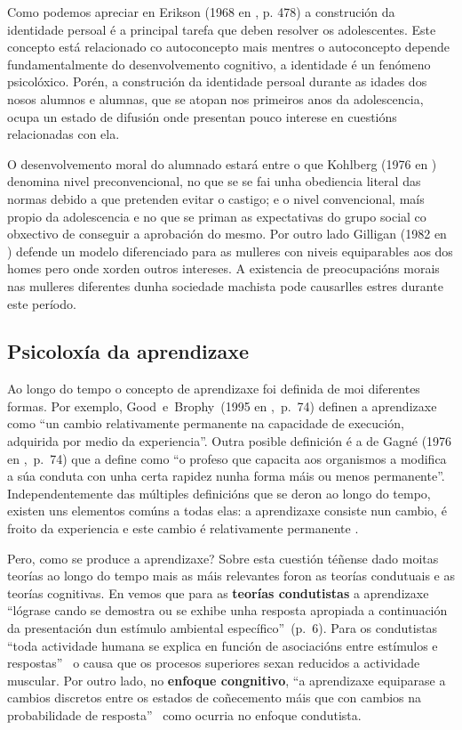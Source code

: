 Como podemos apreciar en Erikson (1968 en , p. 478) a construción da identidade persoal é a principal tarefa que deben resolver os adolescentes. Este concepto está relacionado co autoconcepto mais mentres o autoconcepto depende fundamentalmente do desenvolvemento cognitivo, a identidade é un fenómeno psicolóxico. Porén, a construción da identidade persoal durante as idades dos nosos alumnos e alumnas, que se atopan nos primeiros anos da adolescencia, ocupa un estado de difusión onde presentan pouco interese en cuestións relacionadas con ela.

O desenvolvemento moral do alumnado estará entre o que Kohlberg (1976 en ) denomina nivel preconvencional, no que se se fai unha obediencia literal das normas debido a que pretenden evitar o castigo; e o nivel convencional, maís propio da adolescencia e no que se priman as expectativas do grupo social co obxectivo de conseguir a aprobación do mesmo. Por outro lado Gilligan (1982 en ) defende un modelo diferenciado para as mulleres con niveis equiparables aos dos homes pero onde xorden outros intereses. A existencia de preocupacións morais nas mulleres diferentes dunha sociedade machista pode causarlles estres durante este período.

\subsection{Psicoloxía da aprendizaxe}
Ao longo do tempo o concepto de aprendizaxe foi definida de moi diferentes formas. Por exemplo, Good~e~Brophy~(1995 en ,~p.~74) definen a aprendizaxe como ``un cambio relativamente permanente na capacidade de execución, adquirida por medio da experiencia''. Outra posible definición é a de Gagné (1976 en ,~p.~74) que a define como ``o profeso que capacita aos organismos a modifica a súa conduta con unha certa rapidez nunha forma máis ou menos permanente''. Independentemente das múltiples definicións que se deron ao longo do tempo, existen uns elementos comúns a todas elas: a aprendizaxe consiste nun cambio, é froito da experiencia e este cambio é relativamente permanente \cite{unedpsicoedu}.

Pero, como se produce a aprendizaxe? Sobre esta cuestión téñense dado moitas teorías ao longo do tempo mais as máis relevantes foron as teorías condutuais e as teorías cognitivas. En  vemos que para as \textbf{teorías condutistas} a aprendizaxe ``lógrase cando se demostra ou se exhibe unha resposta apropiada a continuación da presentación dun estímulo ambiental específico''~(p.~6). Para os condutistas ``toda actividade humana se explica en función de asociacións entre estímulos e respostas''~\cite[p.~82]{unedpsicoedu} o causa que os procesos superiores sexan reducidos a actividade muscular. Por outro lado, no \textbf{enfoque congnitivo}, ``a aprendizaxe equiparase a cambios discretos entre os estados de coñecemento máis que con cambios na probabilidade de resposta''~\cite[p.~9]{ertmer1993conductismo} como ocurria no enfoque condutista.

